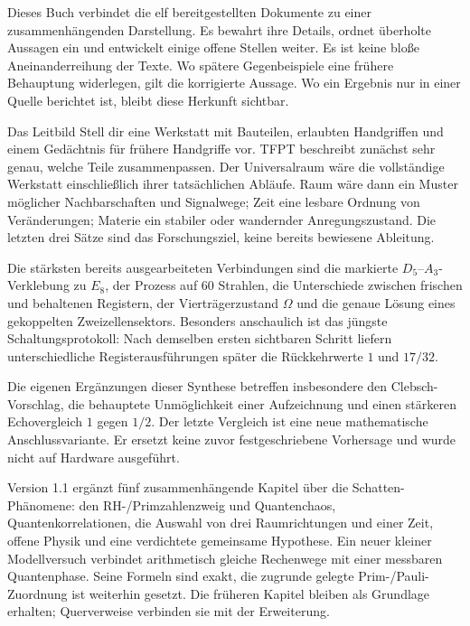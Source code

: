 \documentclass[11pt,a4paper,oneside,parskip=half,headings=normal]{scrreprt}
\begin{document}
Dieses Buch verbindet die elf bereitgestellten Dokumente zu einer zusammenhängenden Darstellung. Es bewahrt ihre Details, ordnet überholte Aussagen ein und entwickelt einige offene Stellen weiter. Es ist keine bloße Aneinanderreihung der Texte. Wo spätere Gegenbeispiele eine frühere Behauptung widerlegen, gilt die korrigierte Aussage. Wo ein Ergebnis nur in einer Quelle berichtet ist, bleibt diese Herkunft sichtbar.

\begin{bild}{Das Leitbild}
Stell dir eine Werkstatt mit Bauteilen, erlaubten Handgriffen und einem Gedächtnis für frühere Handgriffe vor. TFPT beschreibt zunächst sehr genau, welche Teile zusammenpassen. Der Universalraum wäre die vollständige Werkstatt einschließlich ihrer tatsächlichen Abläufe. Raum wäre dann ein Muster möglicher Nachbarschaften und Signalwege; Zeit eine lesbare Ordnung von Veränderungen; Materie ein stabiler oder wandernder Anregungszustand. Die letzten drei Sätze sind das Forschungsziel, keine bereits bewiesene Ableitung.
\end{bild}

Die stärksten bereits ausgearbeiteten Verbindungen sind die markierte $D_5$--$A_3$-Verklebung zu $E_8$, der Prozess auf 60 Strahlen, die Unterschiede zwischen frischen und behaltenen Registern, der Vierträgerzustand $\Omega$ und die genaue Lösung eines gekoppelten Zweizellensektors. Besonders anschaulich ist das jüngste Schaltungsprotokoll: Nach demselben ersten sichtbaren Schritt liefern unterschiedliche Registerausführungen später die Rückkehrwerte $1$ und $17/32$.

Die eigenen Ergänzungen dieser Synthese betreffen insbesondere den Clebsch-Vorschlag, die behauptete Unmöglichkeit einer Aufzeichnung und einen stärkeren Echovergleich $1$ gegen $1/2$. Der letzte Vergleich ist eine neue mathematische Anschlussvariante. Er ersetzt keine zuvor festgeschriebene Vorhersage und wurde nicht auf Hardware ausgeführt.

Version 1.1 ergänzt fünf zusammenhängende Kapitel über die Schatten-Phänomene: den RH-/Primzahlenzweig und Quantenchaos, Quantenkorrelationen, die Auswahl von drei Raumrichtungen und einer Zeit, offene Physik und eine verdichtete gemeinsame Hypothese. Ein neuer kleiner Modellversuch verbindet arithmetisch gleiche Rechenwege mit einer messbaren Quantenphase. Seine Formeln sind exakt, die zugrunde gelegte Prim-/Pauli-Zuordnung ist weiterhin gesetzt. Die früheren Kapitel bleiben als Grundlage erhalten; Querverweise verbinden sie mit der Erweiterung.
\end{document}
